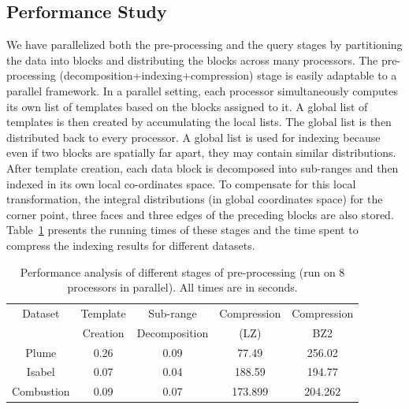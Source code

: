 \subsection{Performance Study}
\label{sec:analysis_time}
We have parallelized both the pre-processing and the query stages by partitioning the data into blocks and distributing the blocks across many processors. The pre-processing  (decomposition+indexing+compression) stage is easily adaptable to a parallel framework. In a parallel setting, each processor simultaneously computes its own list of templates based on the blocks assigned to it. A global list of templates is then created by accumulating the local lists. The global list is then distributed back to every processor. A global list is used for indexing because even if two blocks are spatially far apart, they may contain similar distributions. After template creation, each data block is decomposed into sub-ranges and then indexed in its own local co-ordinates space. To compensate for this local transformation, the integral distributions (in global coordinates space) for the corner point, three faces and three edges of the preceding blocks are also stored. Table~\ref{tbl:encodingperf} presents the running times of these stages and the time spent to compress the indexing results for different datasets. 
\begin{table}[tb]
	\centering	
	\renewcommand{\tabcolsep}{0.09cm}
	\begin{tabular}{|c|c|c|c|c|}
		\hline
		{\small Dataset} & {\small Template} & {\small Sub-range} & {\small Compression} & {\small Compression}\\		
		{\small } & {\small Creation} & {\small Decomposition} & {\small (LZ)} & {\small {BZ2}}\\		
		\hline
		{\small Plume} & {\small 0.26} & {\small 0.09} & {\small 77.49} & {\small 256.02}\\
		{\small Isabel} & {\small 0.07} & {\small 0.04} & {\small 188.59} & {\small 194.77}\\
		{\small Combustion} & {\small 0.09} & {\small 0.07} & {\small 173.899} & {\small 204.262}\\
		\hline				
	\end{tabular}
	\caption{\label{tbl:encodingperf} Performance analysis of different stages of pre-processing (run on 8 processors in parallel). All times are in seconds.}
\end{table}


